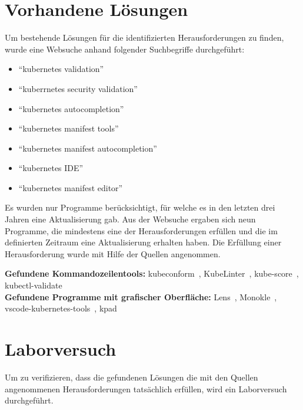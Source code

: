 \section{Vorhandene Lösungen}

Um bestehende Lösungen für die identifizierten Herausforderungen zu finden, wurde eine Websuche anhand folgender Suchbegriffe durchgeführt:
\begin{itemize}
    \setlength\itemsep{-0.5cm}
    \item ``kubernetes validation''
    \item ``kuberrnetes security validation''
    \item ``kubernetes autocompletion''
    \item ``kubernetes manifest tools''
    \item ``kubernetes manifest autocompletion''
    \item ``kubernetes IDE''
    \item ``kubernetes manifest editor''
\end{itemize}

Es wurden nur Programme berücksichtigt, für welche es in den letzten drei Jahren eine Aktualisierung gab.
Aus der Websuche ergaben sich neun Programme, die mindestens eine der Herausforderungen erfüllen und die
im definierten Zeitraum eine Aktualisierung erhalten haben.
Die Erfüllung einer Herausforderung wurde mit Hilfe der Quellen angenommen.

\textbf{Gefundene Kommandozeilentools:} kubeconform~\cite{kubeconform-source}, KubeLinter~\cite{kubelinter-source}, kube-score~\cite{kubescore-source}, kubectl-validate~\cite{kubectl-validate-source}
\\
\textbf{Gefundene Programme mit grafischer Oberfläche:} Lens~\cite{kubernetes-lens-source}, Monokle~\cite{monokle-source}, vscode-kubernetes-tools~\cite{vscode-kubernetes-tools-source}, kpad~\cite{kpad-source}


\section{Laborversuch}

Um zu verifizieren, dass die gefundenen Lösungen die mit den Quellen angenommenen Herausforderungen tatsächlich erfüllen, wird ein Laborversuch durchgeführt.

